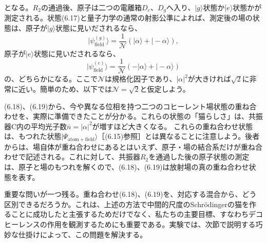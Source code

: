 となる。$R_2$の通過後、原子は二つの電離箱$D_e$、$D_g$へ入り、$|g\rangle$状態か$|e\rangle$状態かが測定される。状態(6.17)と量子力学の通常の射影公準によれば、測定後の場の状態は、原子が$|g\rangle$状態に見いだされるなら、
\begin{equation}|\psi_{\mathrm{field}}^{(g)}\rangle=\frac1{\mathcal N}(|\alpha\rangle+|-\alpha\rangle),\tag{6.18}\end{equation}
原子が$|e\rangle$状態に見いだされるなら、
\begin{equation}|\psi_{\mathrm{field}}^{(e)}\rangle=\frac1{\mathcal N}(-|\alpha\rangle+|-\alpha\rangle)\tag{6.19}\end{equation}
の、どちらかになる。ここで$\mathcal N$は規格化因子であり、$|\alpha|^2$が大きければ$\sqrt2$に非常に近い。簡単のため、以下では$\mathcal N=\sqrt2$と仮定しよう。

(6.18)、(6.19)から、今や異なる位相を持つ二つのコヒーレント場状態の重ね合わせを、実際に準備できたことが分かる。これらの状態の「猫らしさ」は、共振器C内の平均光子数$\bar n=|\alpha|^2$が増すほど大きくなる。
\hypertarget{srcpage:251}{}\label{srcpage:251}
これらの重ね合わせ状態は、もつれた状態$|\Psi_{\mathrm{atom+field}}\rangle$［(6.15)参照］とは異なることに注意しよう。後者からは、場自体が重ね合わせにあるとはいえず、原子・場の結合系だけが重ね合わせで記述される。これに対して、共振器$R_2$を通過した後の原子状態の測定は、原子と場のもつれを解くので、(6.18)、(6.19)は放射場の真の重ね合わせ状態を表す。

重要な問いが一つ残る。重ね合わせ(6.18)、(6.19)を、対応する混合から、どう区別できるだろうか。これは、上述の方法で中間的尺度のSchrödingerの猫を作ることに成功したと主張するためだけでなく、私たちの主要目標、すなわちデコヒーレンスの作用を観測するためにも重要である。実験では、次節で説明する巧妙な仕掛けによって、この問題を解決する。



